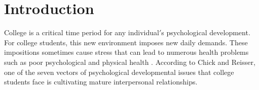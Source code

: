 \documentclass[journal]{./IEEE/IEEEtran}
\title{\SPTITLE}
\author{\ADVISEE~and~\ADVISER%
\REMARK
}
\begin{document}
\maketitle

\begin{abstract}

This article explores the role and importance of roommates in a college student$'$s development - from the initial adaptation in the roommate setting, to their grades and life after college. We highlight the importance of finding the proper roommates and propose a solution in the form of a web application to help UPLB students find mutually beneficial roommates for their college life. This solution also extends itself to solve the \textit{dorm-finding} problem we experience at the start of every semester.
\end{abstract}


\section{Introduction}

    College is a critical time period for any individual$'$s psychological development\cite{erb}. For college students, this new environment imposes new daily demands. These impositions sometimes cause stress that can lead to numerous health problems such as poor psychological and physical health \cite{sladek}.
    According to Chick and Reisser, one of the seven vectors of psychological developmental issues that college students face is cultivating mature interpersonal relationships\cite{chickering}.
\end{document}
